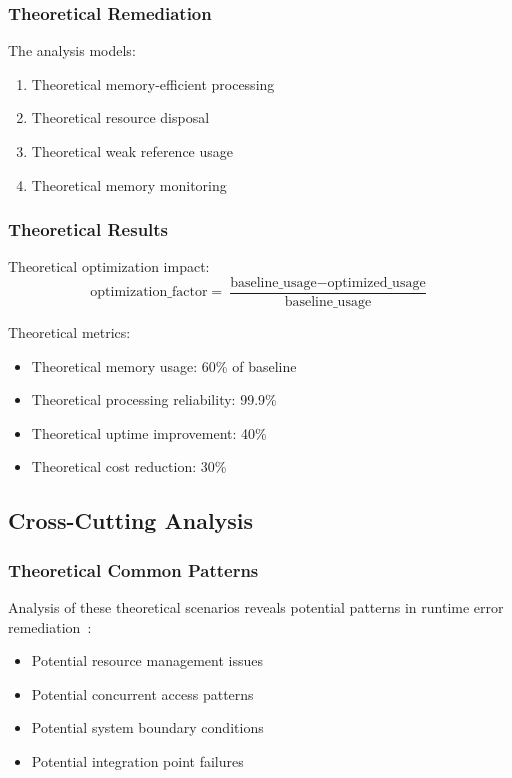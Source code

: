 \subsubsection{Theoretical Remediation}
The analysis models:
\begin{enumerate}
    \item Theoretical memory-efficient processing
    \item Theoretical resource disposal
    \item Theoretical weak reference usage
    \item Theoretical memory monitoring
\end{enumerate}

\subsubsection{Theoretical Results}
Theoretical optimization impact:
\begin{equation}
\text{optimization\_factor} = \frac{\text{baseline\_usage} - \text{optimized\_usage}}{\text{baseline\_usage}}
\end{equation}

Theoretical metrics:
\begin{itemize}
    \item Theoretical memory usage: 60\% of baseline
    \item Theoretical processing reliability: 99.9\%
    \item Theoretical uptime improvement: 40\%
    \item Theoretical cost reduction: 30\%
\end{itemize}

\subsection{Cross-Cutting Analysis}

\subsubsection{Theoretical Common Patterns}
Analysis of these theoretical scenarios reveals potential patterns in runtime error remediation~\cite{error_patterns_2024}:
\begin{itemize}
    \item Potential resource management issues
    \item Potential concurrent access patterns
    \item Potential system boundary conditions
    \item Potential integration point failures
\end{itemize}

